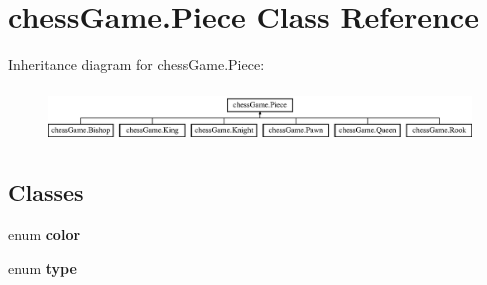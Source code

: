 \hypertarget{classchess_game_1_1_piece}{}\section{chess\+Game.\+Piece Class Reference}
\label{classchess_game_1_1_piece}
Inheritance diagram for chess\+Game.\+Piece\+:\begin{figure}[H]
\begin{center}
\leavevmode
\includegraphics[height=1.469816cm]{classchess_game_1_1_piece}
\end{center}
\end{figure}
\subsection*{Classes}
\begin{DoxyCompactItemize}
\item 
enum {\bfseries color}
\item 
enum {\bfseries type}
\end{DoxyCompactItemize}
